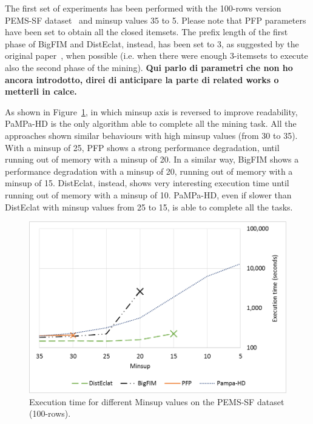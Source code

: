 The first set of experiments has been performed with the 100-rows version PEMS-SF dataset~\cite{uci} and minsup values 35 to 5.
Please note that PFP parameters have been set to obtain all the closed itemsets. The prefix length of the first phase of BigFIM and DistEclat, instead, has been set to 3, as suggested by the original paper~\cite{bigfim}, when possible (i.e. when there were enough 3-itemsets to execute also the second phase of the mining). 
\textbf{Qui parlo di parametri che non ho ancora introdotto, direi di anticipare la parte di related works o metterli in calce.}

As shown in Figure~\ref{pems_confronto}, in which minsup axis is reversed to improve readability, PaMPa-HD is the only algorithm able to complete all the mining task. All the approaches shown similar behaviours with high minsup values (from 30 to 35).
With a minsup of 25, PFP shows a strong performance degradation, until running out of memory with a minsup of 20.
In a similar way, BigFIM shows a performance degradation with a minsup of 20, running out of memory with a minsup of 15. 
DistEclat, instead, shows very interesting execution time until running out of memory with a minsup of 10.
PaMPa-HD, even if slower than DistEclat with minsup values from 25 to 15, is able to complete all the tasks.


\begin{figure}[!t]
\includegraphics[width=5in]{immagini_extension/pems_confronto.png}
\caption{Execution time for different Minsup values on the PEMS-SF dataset (100-rows).}
\label{pems_confronto}
\end{figure}

